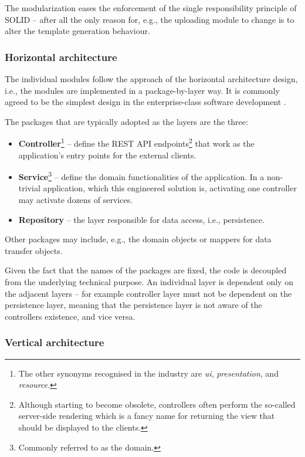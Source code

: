 \documentclass[a4paper,twoside,12pt]{book}
\begin{document}
The modularization eases the enforcement of the single responsibility principle of SOLID \cite{bib:clean_code} -- after all the only reason for, e.g., the uploading module to change is to alter the template generation behaviour.

\subsubsection{Horizontal architecture}

The individual modules follow the approach of the horizontal architecture design, i.e., the modules are implemented in a package-by-layer way. It is commonly agreed to be the simplest design in the enterprise-class software development \cite{bib:fowler}.

The packages that are typically adopted as the layers are the three:
\begin{itemize}
\item \textbf{Controller}\footnote{The other synonyms recognised in the industry are \textit{ui}, \textit{presentation}, and \textit{resource}.} -- define the REST API endpoints\footnote{Although starting to become obsolete, controllers often perform the so-called server-side rendering which is a fancy name for returning the view that should be displayed to the clients.} that work as the application's entry points for the external clients.
\item \textbf{Service}\footnote{Commonly referred to as the domain.} -- define the domain functionalities of the application. In a non-trivial application, which this engineered solution is, activating one controller may activate dozens of services.
\item \textbf{Repository} -- the layer responsible for data access, i.e., persistence.
\end{itemize}

Other packages may include, e.g., the domain objects or mappers for data transfer objects.

Given the fact that the names of the packages are fixed, the code is decoupled from the underlying technical purpose. An individual layer is dependent only on the adjacent layers -- for example controller layer must not be dependent on the persistence layer, meaning that the persistence layer is not aware of the controllers existence, and vice versa.


\subsubsection{Vertical architecture}
\end{document}
